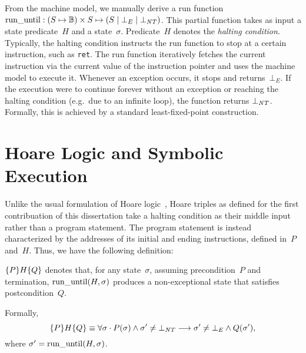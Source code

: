 From the machine model, we manually derive a run function
$\operatorname{run\_until}:(S\mapsto\mathbb{B})\times S\mapsto(S\mid\bot_E\mid\bot_{\mathit{NT}})$.%
This partial function takes as input a state predicate~$H$ and a state~$\sigma$.
Predicate~$H$ denotes the \emph{halting condition}.
Typically, the halting condition instructs the run function to stop
at a certain instruction, such as \lstinline{ret}.
The run function iteratively fetches the current instruction
via the current value of the instruction pointer
and uses the machine model to execute it.
Whenever an exception occurs, it stops and returns~$\bot_E$.
If the execution were to continue forever
without an exception or reaching the halting condition
(e.g.\ due to an infinite loop),
the function returns $\bot_{\mathit{NT}}$.
Formally, this is achieved by a standard least-fixed-point construction.

\section{Hoare Logic and Symbolic Execution}
Unlike the usual formulation of Hoare logic~\citep{hoare1969axiomatic,myreen2007hoare},
Hoare triples as defined for the first contribuation of this dissertation
take a halting condition
as their middle input rather than a program statement.
The program statement is instead characterized by the addresses of its initial
and ending instructions, defined in~$P$ and~$H$.
Thus, we have the following definition:
\begin{definition}\label{def:htriple}
  $\{P\}H\{Q\}$
  denotes that, for any state~$\sigma$, assuming precondition~$P$ and termination,
  $\operatorname{run\_until}(H,\sigma)$ produces a non-exceptional state that satisfies postcondition~$Q$.
  
  Formally,
  \begin{equation}
    \{P\}H\{Q\}\equiv\forall\sigma\cdot
    P(\sigma)\wedge\sigma'\neq\bot_{\mathit{NT}}\longrightarrow
    \sigma'\neq\bot_E\wedge Q(\sigma'),
  \end{equation}
  where $\sigma'=\operatorname{run\_until}(H,\sigma)$.
\end{definition}
 
